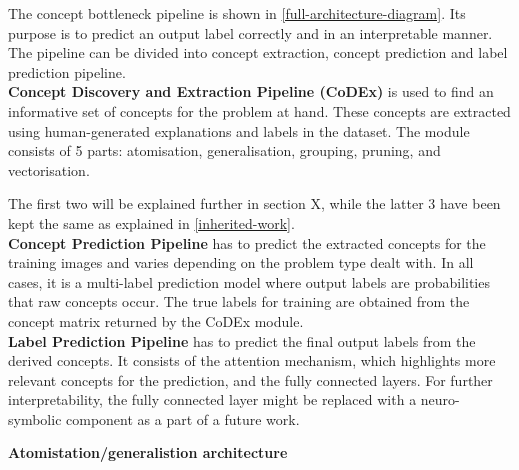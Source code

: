 The concept bottleneck pipeline is shown in \ref{full-architecture-diagram}. 
Its purpose is to predict an output label correctly and in an interpretable manner.
The pipeline can be divided into concept extraction, concept prediction and label prediction pipeline. \\

\textbf{Concept Discovery and Extraction Pipeline (CoDEx)} is used to find an informative set of concepts for the problem at hand.
These concepts are extracted using human-generated explanations and labels in the dataset. 
The module consists of 5 parts: atomisation, generalisation, grouping, pruning, and vectorisation.

The first two will be explained further in section X, while the latter 3 have been kept the same as explained in \autoref{inherited-work}. \\


\textbf{Concept Prediction Pipeline} has to predict the extracted concepts for the training images and varies depending on the problem type dealt with.
In all cases, it is a multi-label prediction model where output labels are probabilities that raw concepts occur.
The true labels for training are obtained from the concept matrix returned by the CoDEx module. \\

\textbf{Label Prediction Pipeline} has to predict the final output labels from the derived concepts. 
It consists of the attention mechanism, which highlights more relevant concepts for the prediction, and the fully connected layers. 
For further interpretability, the fully connected layer might be replaced with a neuro-symbolic component as a part of a future work.


\textbf{Atomistation/generalistion architecture}

